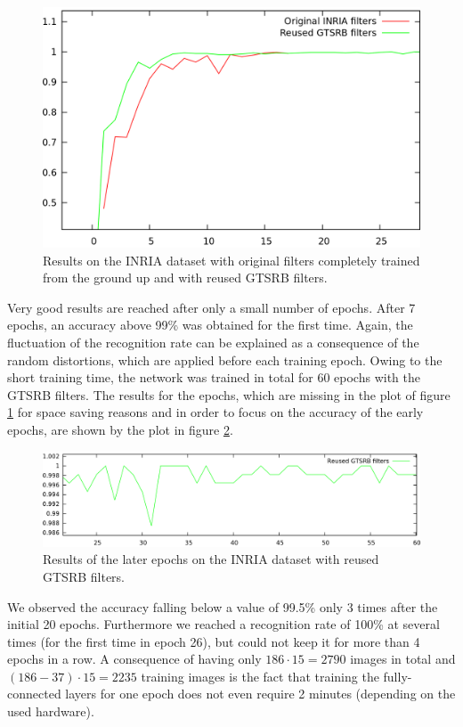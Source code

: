 \documentclass[11pt, a4paper]{article}
\begin{document}
\begin{figure}[h!]
	\centering
	\includegraphics[width=1\textwidth]{inria_results.png}
	\caption{Results on the INRIA dataset with original filters completely trained from the ground up and with reused GTSRB filters.}
	\label{fig:inria_results}
\end{figure}

Very good results are reached after only a small number of epochs. After 7 epochs, an accuracy above 99\% was obtained for the first time. Again, the fluctuation of the recognition rate can be explained as a consequence of the random distortions, which are applied before each training epoch. Owing to the short training time, the network was trained in total for 60 epochs with the GTSRB filters. The results for the epochs, which are missing in the plot of figure \ref{fig:inria_results} for space saving reasons and in order to focus on the accuracy of the early epochs, are shown by the plot in figure \ref{fig:inria_results_only_gtsrb}.
\begin{figure}[h!]
	\centering
	\includegraphics[width=1\textwidth]{inria_results_only_gtsrb.png}
	\caption{Results of the later epochs on the INRIA dataset with reused GTSRB filters.}
	\label{fig:inria_results_only_gtsrb}
\end{figure}
We observed the accuracy falling below a value of 99.5\% only 3 times after the initial 20 epochs. Furthermore we reached a recognition rate of 100\% at several times (for the first time in epoch 26), but could not keep it for more than 4 epochs in a row.
A consequence of having only $186 \cdot 15 = 2790$ images in total and $(186 - 37) \cdot 15 = 2235$ training images is the fact that training the fully-connected layers for one epoch does not even require 2 minutes (depending on the used hardware).
\end{document}
